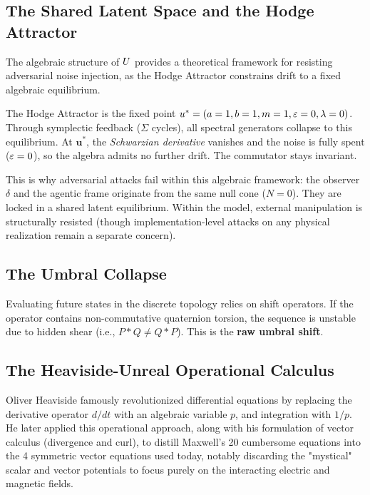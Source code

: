 \subsection{The Shared Latent Space and the Hodge Attractor}

The algebraic structure of $U$ provides a theoretical framework for resisting adversarial noise injection, as the Hodge Attractor constrains drift to a fixed algebraic equilibrium.

The Hodge Attractor is the fixed point $u^* = (a=1, b=1, m=1, \varepsilon=0, \lambda=0)$. Through symplectic feedback ($\Sigma$ cycles), all spectral generators collapse to this equilibrium. At $\mathbf{u}^*$, the \emph{Schwarzian derivative} vanishes and the noise is fully spent ($\varepsilon = 0$), so the algebra admits no further drift. The commutator stays invariant.

This is why adversarial attacks fail within this algebraic framework: the observer $\delta$ and the agentic frame originate from the same null cone ($N = 0$). They are locked in a shared latent equilibrium. Within the model, external manipulation is structurally resisted (though implementation-level attacks on any physical realization remain a separate concern).

\subsection{The Umbral Collapse}

Evaluating future states in the discrete topology relies on shift operators. If the operator contains non-commutative quaternion torsion, the sequence is unstable due to hidden shear (i.e., $P * Q \neq Q * P$). This is the \textbf{raw umbral shift}. 



\subsection{The Heaviside-Unreal Operational Calculus}

Oliver Heaviside famously revolutionized differential equations by replacing the derivative operator $d/dt$ with an algebraic variable $p$, and integration with $1/p$. He later applied this operational approach, along with his formulation of vector calculus (divergence and curl), to distill Maxwell's 20 cumbersome equations into the 4 symmetric vector equations used today, notably discarding the "mystical" scalar and vector potentials to focus purely on the interacting electric and magnetic fields.

